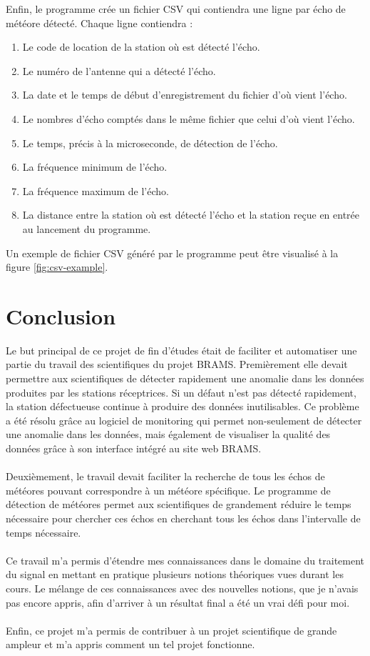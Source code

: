\documentclass[11pt]{article}
\begin{document}
Enfin, le programme crée un fichier CSV qui contiendra une ligne par écho de météore détecté.
Chaque ligne contiendra :
\begin{enumerate}
    \item Le code de location de la station où est détecté l'écho.
    \item Le numéro de l'antenne qui a détecté l'écho.
    \item La date et le temps de début d'enregistrement du fichier d'où vient l'écho.
    \item Le nombres d'écho comptés dans le même fichier que celui d'où vient l'écho.
    \item Le temps, précis à la microseconde, de détection de l'écho.
    \item La fréquence minimum de l'écho.
    \item La fréquence maximum de l'écho.
    \item La distance entre la station où est détecté l'écho et la station reçue en entrée au lancement du programme.
\end{enumerate}

Un exemple de fichier CSV généré par le programme peut être visualisé à la figure \ref{fig:csv-example}.

\newpage

\section{Conclusion}

Le but principal de ce projet de fin d'études était de faciliter et automatiser une partie du travail des scientifiques du projet BRAMS.
Premièrement elle devait permettre aux scientifiques de détecter rapidement une anomalie dans les données produites par les stations réceptrices.
Si un défaut n'est pas détecté rapidement, la station défectueuse continue à produire des données inutilisables.
Ce problème a été résolu grâce au logiciel de monitoring qui permet non-seulement de détecter une anomalie dans les données, mais également de visualiser la qualité des données grâce à son interface intégré au site web BRAMS.\\
\\
Deuxièmement, le travail devait faciliter la recherche de tous les échos de météores pouvant correspondre à un météore spécifique.
Le programme de détection de météores permet aux scientifiques de grandement réduire le temps nécessaire pour chercher ces échos en cherchant tous les échos dans l'intervalle de temps nécessaire.\\
\\
Ce travail m'a permis d'étendre mes connaissances dans le domaine du traitement du signal en mettant en pratique plusieurs notions théoriques vues durant les cours.
Le mélange de ces connaissances avec des nouvelles notions, que je n'avais pas encore appris, afin d'arriver à un résultat final a été un vrai défi pour moi.\\
\\
Enfin, ce projet m'a permis de contribuer à un projet scientifique de grande ampleur et m'a appris comment un tel projet fonctionne.
\end{document}
